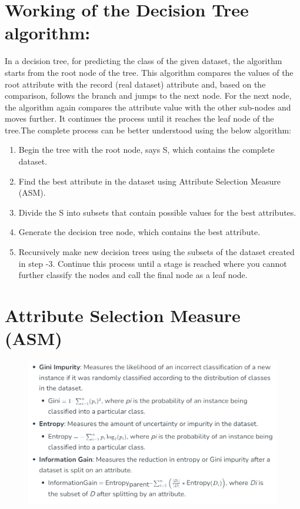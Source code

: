 \documentclass[12pt,a4paper]{report}
\newenvironment{codedstep}[1][]
  {\begin{enumerate}[label=Step \arabic*:]}
  {\end{enumerate}}
\begin{document}
\section{Working of the Decision Tree algorithm:}
In a decision tree, for predicting the class of the given dataset, the algorithm starts from the root node of the tree. This algorithm compares the values of the root attribute with the record (real dataset) attribute and, based on the comparison, follows the branch and jumps to the next node.
For the next node, the algorithm again compares the attribute value with the other sub-nodes and moves further. It continues the process until it reaches the leaf node of the tree.\newpage The complete process can be better understood using the below algorithm:
\begin{codedstep}
\item Begin the tree with the root node, says S, which contains the complete dataset.
\item Find the best attribute in the dataset using Attribute Selection Measure (ASM).
\item Divide the S into subsets that contain possible values for the best attributes.
\item Generate the decision tree node, which contains the best attribute.
\item Recursively make new decision trees using the subsets of the dataset created in step -3. Continue this process until a stage is reached where you cannot further classify the nodes and call the final node as a leaf node.
\end{codedstep}

\section*{Attribute Selection Measure (ASM)}
\begin{figure}[htbp]
    \centering
    \includegraphics[width=\textwidth]{DT-2.png}
\end{figure}
\end{document}
